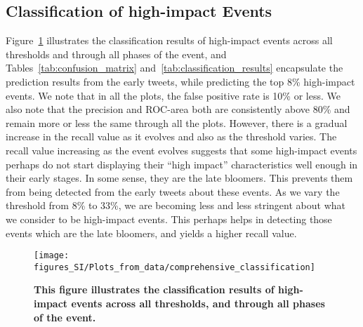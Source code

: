 \subsection{Classification of high-impact Events}
\label{subsec:classification}
Figure~\ref{fig:classification} illustrates the classification results
of high-impact events across all thresholds and through all phases of
the event, and Tables~\ref{tab:confusion_matrix}
and~\ref{tab:classification_results} encapsulate the prediction results
from the early tweets, while predicting the top 8\% high-impact
events. We note that in all the plots, the false positive rate is 
10\% or less. We also note that the precision and ROC-area both are
consistently above 80\% and remain more or less the same through all
the plots. However, there is a gradual increase in the recall value as
it evolves and also as the threshold varies. The recall value
increasing as the event evolves suggests that some high-impact events
perhaps do not start displaying their ``high impact'' characteristics
well enough in their early stages. In some sense, they are the late
bloomers. This prevents them from being detected from the early tweets
about these events. As we vary the threshold from 8\% to 33\%, we are
becoming less and less stringent about what we consider to be
high-impact events. This perhaps helps in detecting those events which
are the late bloomers, and yields a higher recall value.
\begin{figure}
  \texttt{[image: figures\_SI/Plots\_from\_data/comprehensive\_classification]}
  \caption{\textbf{This figure illustrates the classification results
      of high-impact events across all thresholds, and through all
      phases of the event.}}
  \label{fig:classification}
\end{figure}

